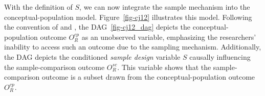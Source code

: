 \documentclass[
  authoryear,
  review,
  1p]{elsarticle}
\begin{document}
With the definition of \(S\), we can now integrate the sample mechanism
into the conceptual-population model. Figure~\ref{fig-cj12} illustrates
this model. Following the convention of
\citet[pp.~499-516]{McElreath_2020} and
\citet[pp.~6]{Deffner_et_al_2022}, the DAG~\ref{fig-cj12_dag} depicts
the conceptual-population outcome \(O^{cp}_{R}\) as an unobserved
variable, emphasizing the researchers' inability to access such an
outcome due to the sampling mechanism. Additionally, the DAG depicts the
conditioned \emph{sample design} variable \(S\) causally influencing the
sample-comparison outcome \(O^{sc}_{R}\). This variable shows that the
sample-comparison outcome is a subset drawn from the
conceptual-population outcome \(O^{cp}_{R}\).

\begin{figure}[H]

\begin{minipage}{\linewidth}

\centering{

\[
\begin{aligned}
  O^{sc}_{R} & := f_{S}(O^{cp}_{R}, S) \\
  O^{cp}_{R} & := f_{O}(D_{R}) \\
  D_{R} & := f_{D}(T_{IA}, B_{JK}) \\
  T_{IA} & := f_{T}(T_{I}, X_{IA}, e_{IA}) \\
  T_{I} & := f_{T}(X_{I}, e_{I}) \\
  B_{JK} & := f_{B}(B_{J}, Z_{JK}, e_{JK}) \\
  B_{J} & := f_{B}(Z_{J}, e_{J}) \\
  e_{I} & \:\bot\:\{ e_{J}, e_{IA}, e_{JK} \} \\
  e_{J} & \:\bot\:\{ e_{IA}, e_{JK} \} \\
  e_{IA} & \:\bot\:e_{JK} 
\end{aligned}
\]

}


\end{minipage}%
\newline
\begin{minipage}{\linewidth}

\end{minipage}
\end{figure}
\end{document}
